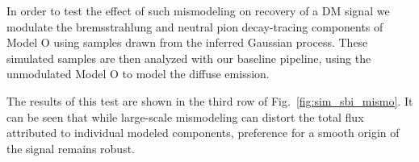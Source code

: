 \documentclass[prd,aps,10pt,nofootinbib,twocolumn,superscriptaddress,preprintnumbers,balancelastpage,longbibliography]{revtex4-1}
\begin{document}
In order to test the effect of such mismodeling on recovery of a DM signal we modulate the bremsstrahlung and neutral pion decay-tracing components of Model O using samples drawn from the inferred Gaussian process. These simulated samples are then analyzed with our baseline pipeline, using the unmodulated Model O to model the diffuse emission.

The results of this test are shown in the third row of Fig.~\ref{fig:sim_sbi_mismo}. It can be seen that while large-scale mismodeling can distort the total flux attributed to individual modeled components, preference for a smooth origin of the signal remains robust. \\

\end{document}
